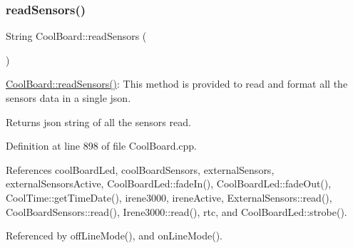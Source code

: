 \subsubsection{\texorpdfstring{read\+Sensors()}{readSensors()}}
{\footnotesize\ttfamily String Cool\+Board\+::read\+Sensors (\begin{DoxyParamCaption}{ }\end{DoxyParamCaption})}

\hyperlink{classCoolBoard_ad03abdce2e65f520bbf2cff0f2d083cf}{Cool\+Board\+::read\+Sensors()}\+: This method is provided to read and format all the sensors data in a single json.

\begin{DoxyReturn}{Returns}
json string of all the sensors read. 
\end{DoxyReturn}


Definition at line 898 of file Cool\+Board.\+cpp.



References cool\+Board\+Led, cool\+Board\+Sensors, external\+Sensors, external\+Sensors\+Active, Cool\+Board\+Led\+::fade\+In(), Cool\+Board\+Led\+::fade\+Out(), Cool\+Time\+::get\+Time\+Date(), irene3000, irene\+Active, External\+Sensors\+::read(), Cool\+Board\+Sensors\+::read(), Irene3000\+::read(), rtc, and Cool\+Board\+Led\+::strobe().



Referenced by off\+Line\+Mode(), and on\+Line\+Mode().


